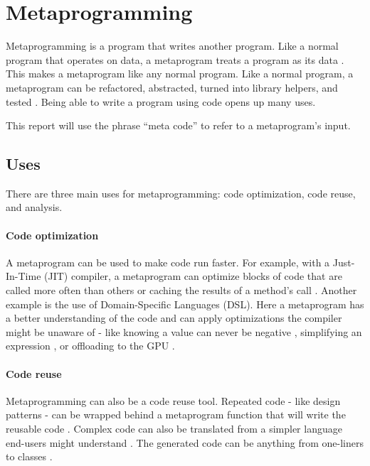 \section{Metaprogramming}
Metaprogramming is a program that writes another program.
Like a normal program that operates on data, a metaprogram treats a program as its data \cite{savidis_19_01, anggoro_17_01, sheard_01_01}.
This makes a metaprogram like any normal program.
Like a normal program, a metaprogram can be refactored, abstracted, turned into library helpers, and tested \cite{lilis_15_01}.
Being able to write a program using code opens up many uses.

\begin{notebox}
	This report will use the phrase ``meta code'' to refer to a metaprogram's input.
\end{notebox}


\subsection{Uses}
There are three main uses for metaprogramming: code optimization, code reuse, and analysis.

\paragraph{Code optimization}
A metaprogram can be used to make code run faster.
For example, with a Just-In-Time (JIT) compiler, a metaprogram can optimize blocks of code that are called more often than others \cite{hinsen_13_01} or caching the results of a method's call \cite{seaton_15_01}.
Another example is the use of Domain-Specific Languages (DSL). 
Here a metaprogram has a better understanding of the code and can apply optimizations the compiler might be unaware of - like knowing a value can never be negative \cite{hinsen_13_01}, simplifying an expression \cite{sheard_01_01}, or offloading to the GPU \cite{videau_18_01}.

\paragraph{Code reuse}
Metaprogramming can also be a code reuse tool.
Repeated code - like design patterns \cite{lilis_15_01, alexandrescu_01_01} - can be wrapped behind a metaprogram function that will write the reusable code \cite{savidis_19_01, klabnik_2019_01}.
Complex code can also be translated from a simpler language end-users might understand \cite{hinsen_13_01}.
The generated code can be anything from one-liners to classes \cite{savidis_19_01}.

